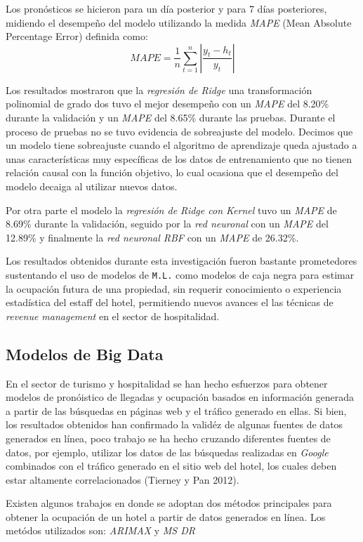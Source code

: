{Los pronósticos se hicieron para un día posterior y para 7 días posteriores, midiendo el desempeño del modelo utilizando la medida \emph{MAPE} (Mean Absolute Percentage Error) definida como: $$MAPE=\frac{1}{n}\sum_{t=1}^{n}|\frac{y_t-h_t}{y_t}|$$

Los resultados mostraron que la \emph{regresión de Ridge} una transformación polinomial de grado dos tuvo el mejor desempeño con un \emph{MAPE} del 8.20\% durante la validación y un \emph{MAPE} del 8.65\% durante las pruebas. Durante el proceso de pruebas no se tuvo evidencia de sobreajuste del modelo. Decimos que un modelo tiene sobreajuste cuando el algoritmo de aprendizaje queda ajustado a unas características muy específicas de los datos de entrenamiento que no tienen relación causal con la función objetivo, lo cual ocasiona que el desempeño del modelo decaiga al utilizar nuevos datos.

Por otra parte el modelo la \emph{regresión de Ridge con Kernel} tuvo un \emph{MAPE} de 8.69\% durante la validación, seguido por la \emph{red neuronal} con un \emph{MAPE} del 12.89\% y finalmente la \emph{red neuronal RBF} con un \emph{MAPE} de 26.32\%.

Los resultados obtenidos durante esta investigación fueron bastante prometedores sustentando el uso de modelos de \texttt{M.L.} como modelos de caja negra para estimar la ocupación futura de una propiedad, sin requerir conocimiento o experiencia estadística del estaff del hotel, permitiendo nuevos avances el las técnicas de \emph{revenue management} en el sector de hospitalidad.

\subsection*{Modelos de Big Data}

En el sector de turismo y hospitalidad se han hecho esfuerzos para obtener modelos de pronóistico de llegadas y ocupación basados en información generada a partir de las búsquedas en páginas web y el tráfico generado en ellas. Si bien, los resultados obtenidos han confirmado la validéz de algunas fuentes de datos generados en línea, poco trabajo se ha hecho cruzando diferentes fuentes de datos, por ejemplo, utilizar los datos de las búsquedas realizadas en \emph{Google} combinados con el tráfico generado en el sitio web del hotel, los cuales deben estar altamente correlacionados (Tierney y Pan 2012).

Existen algunos trabajos en donde se adoptan dos métodos principales para obtener la ocupación de un hotel a partir de datos generados en línea. Los metódos utilizados son: \emph{ARIMAX} y \emph{MS DR}

}
